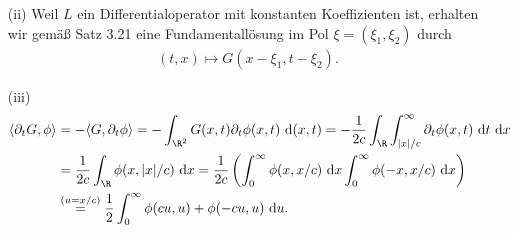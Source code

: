 \begin{solution}
\begin{itemize}
\item[(ii)] Weil $L$ ein Differentialoperator mit konstanten Koeffizienten ist, erhalten wir gemäß Satz 3.21 eine Fundamentallösung im Pol $\xi = (\xi_1, \xi_2)$ durch
\begin{align*}
(t, x) \mapsto G(x - \xi_1, t - \xi_2).
\end{align*}

\item[(iii)]
\begin{align*}
    \langle \partial_t G, \phi \rangle &= - \langle G, \partial_t \phi \rangle =
    - \int_{\R^2} G(x, t) \partial_t \phi(x, t) \mathrm{~d}(x, t) =
    - \frac{1}{2c} \int_\R \int_{|x|/c}^\infty \partial_t \phi(x, t)    \mathrm{~d}t \mathrm{~d}x \\
    &= \frac{1}{2c} \int_\R \phi(x, |x|/c) \mathrm{~d}x =
    \frac{1}{2c} \left( \int_0^\infty \phi(x, x/c) \mathrm{~d}x \int_0^\infty \phi(-x, x/c) \mathrm{~d}x \right)  \\
    &\stackrel{(u = x/c)}{~=~} \frac{1}{2} \int_0^\infty \phi(cu, u) + \phi(-cu, u) \mathrm{~d}u.
\end{align*}

\end{itemize}

\end{solution}

